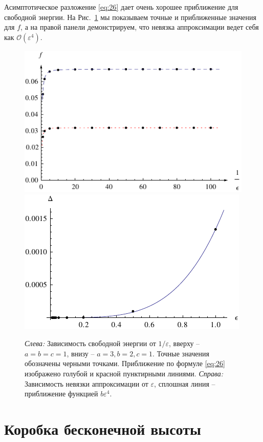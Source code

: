 \documentclass{article}
\begin{document}
Асимптотическое разложение \eqref{eq:26} дает очень хорошее приближение для свободной энергии. На
Рис.~\ref{fig:approx-acc} мы показываем точные и приближенные значения для $f$, а на правой
панели демонстрируем, что невязка аппроксимации ведет себя как  $\mathcal{O}(\varepsilon^{4})$. 

\begin{figure}[htbp]
  \includegraphics[scale=0.9]{exact-vs-approximation}
  \includegraphics{error-1}
  \caption{\label{fig:approx-acc} {\it Слева:} Зависимость свободной энергии от  $1/\varepsilon$,
    вверху -- $a=b=c=1$, внизу -- $a=3, b=2, c=1$. Точные значения обозначены черными точками.
    Приближение по формуле  \eqref{eq:26} изображено голубой и красной пунктирными линиями.  {\it
      Справа:} Зависимость невязки аппроксимации от $\varepsilon$, сплошная линия -- приближение
    функцией $b\varepsilon^{4}$.}
\end{figure}

\section{Коробка бесконечной высоты}
\label{sec:gener-other-doma}
\end{document}
